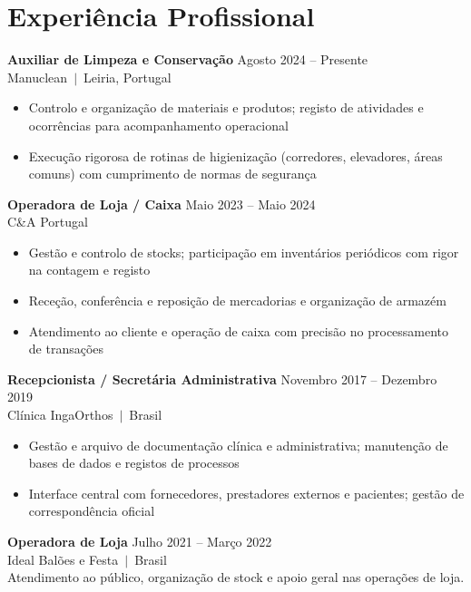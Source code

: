 \documentclass[10pt,a4paper]{article}
\begin{document}
\section{Experiência Profissional}

{\small\bfseries Auxiliar de Limpeza e Conservação}\hfill{\small\color{subtle} Agosto 2024 -- Presente}\\
{\small\color{accent} Manuclean~$|$~Leiria, Portugal}
\begin{itemize}\small
  \item Controlo e organização de materiais e produtos; registo de atividades e ocorrências para acompanhamento operacional
  \item Execução rigorosa de rotinas de higienização (corredores, elevadores, áreas comuns) com cumprimento de normas de segurança
\end{itemize}

\vspace{4pt}
{\small\bfseries Operadora de Loja / Caixa}\hfill{\small\color{subtle} Maio 2023 -- Maio 2024}\\
{\small\color{accent} C\&A Portugal}
\begin{itemize}\small
  \item Gestão e controlo de stocks; participação em inventários periódicos com rigor na contagem e registo
  \item Receção, conferência e reposição de mercadorias e organização de armazém
  \item Atendimento ao cliente e operação de caixa com precisão no processamento de transações
\end{itemize}

\vspace{4pt}
{\small\bfseries Recepcionista / Secretária Administrativa}\hfill{\small\color{subtle} Novembro 2017 -- Dezembro 2019}\\
{\small\color{accent} Clínica IngaOrthos~$|$~Brasil}
\begin{itemize}\small
  \item Gestão e arquivo de documentação clínica e administrativa; manutenção de bases de dados e registos de processos
  \item Interface central com fornecedores, prestadores externos e pacientes; gestão de correspondência oficial
\end{itemize}

\vspace{4pt}
{\small\bfseries Operadora de Loja}\hfill{\small\color{subtle} Julho 2021 -- Março 2022}\\
{\small\color{accent} Ideal Balões e Festa~$|$~Brasil}\\
{\small Atendimento ao público, organização de stock e apoio geral nas operações de loja.}
\end{document}
